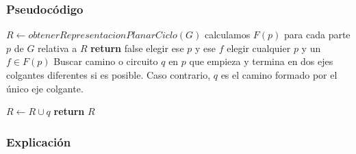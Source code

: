\newpage
\subsubsection{Pseudoc\'odigo}

\begin{algorithm}
\begin{algorithmic}[1]
    \State $R \gets obtenerRepresentacionPlanarCiclo(G)$
        \State calculamos $F(p)$ para cada parte $p$ de $G$ relativa a $R$
            \State \textbf{return} false
            \State elegir ese $p$ y ese $f$
        \Else
            \State elegir cualquier $p$ y un $f \in F(p)$ 
        \EndIf
        \State Buscar camino o circuito $q$ en $p$ que empieza y termina en dos
        \State ejes colgantes diferentes si es posible. Caso contrario, $q$ es
        \State el camino formado por el \'unico eje colgante.
    
        \State $R \gets R \cup q$
    \EndWhile
    \State \textbf{return} $R$
\EndFunction
\end{algorithmic}
\end{algorithm}

\subsubsection*{Explicaci\'on}

